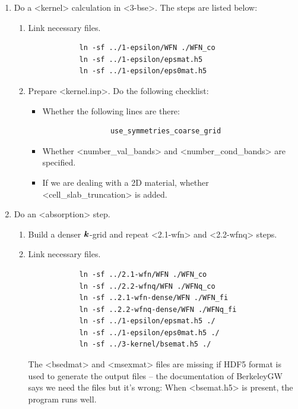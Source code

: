 \documentclass[hyperref, a4paper, 12pt]{report}
\def\texttt#1{<#1>}%
\newcommand{\shortcode}[1]{\texttt{#1}}
\begin{document}
\begin{enumerate}
    \item Do a \shortcode{kernel} calculation in \shortcode{3-bse}. The steps are listed below:
    \begin{enumerate}
        \item Link necessary files.
        \begin{lstlisting}
            ln -sf ../1-epsilon/WFN ./WFN_co
            ln -sf ../1-epsilon/epsmat.h5 
            ln -sf ../1-epsilon/eps0mat.h5     
        \end{lstlisting}
        \item Prepare \shortcode{kernel.inp}. Do the following checklist:
        \begin{itemize}
            \item Whether the following lines are there:
            \begin{lstlisting}
                use_symmetries_coarse_grid
            \end{lstlisting}
            \item Whether \shortcode{number_val_bands} and \shortcode{number_cond_bands}
            are specified.
            \item If we are dealing with a 2D material,
            whether \shortcode{cell_slab_truncation} is added.
        \end{itemize}
    \end{enumerate}
    \item Do an \shortcode{absorption} step. 
    \begin{enumerate}
        \item Build a denser $\vb*{k}$-grid 
        and repeat \shortcode{2.1-wfn} and \shortcode{2.2-wfnq} steps.
        \item Link necessary files.
        \begin{lstlisting}
            ln -sf ../2.1-wfn/WFN ./WFN_co
            ln -sf ../2.2-wfnq/WFN ./WFNq_co
            ln -sf ..2.1-wfn-dense/WFN ./WFN_fi
            ln -sf ..2.2-wfnq-dense/WFN ./WFNq_fi
            ln -sf ../1-epsilon/epsmat.h5 ./
            ln -sf ../1-epsilon/eps0mat.h5 ./
            ln -sf ../3-kernel/bsemat.h5 ./ 
        \end{lstlisting}
        The \shortcode{bsedmat} and \shortcode{msexmat} files are missing 
        if HDF5 format is used to generate the output files -- 
        the documentation of BerkeleyGW says we need the files but it's wrong:
        When \shortcode{bsemat.h5} is present, the program runs well.

\end{enumerate}
\end{enumerate}
\end{document}
